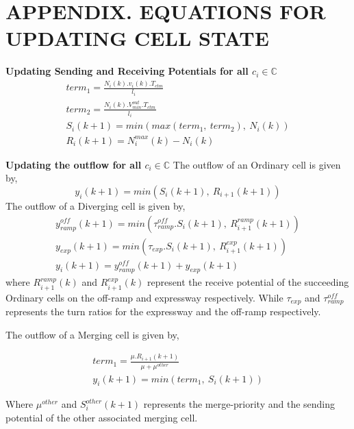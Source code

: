 \documentclass[12pt]{article}
\begin{document}
\section{APPENDIX. EQUATIONS FOR UPDATING CELL STATE}
\label{appendix:a}

\textbf{Updating Sending and Receiving Potentials for all $c_i\in \mathbb{C}$}
\begin{subequations} 
\label{eq:sp-rp}
\begin{eqnarray}
term_1=\frac{N_i(k).v_i(k).T_{ctm}}{l_i}\\
term_2=\frac{N_i(k).V^{out}_{min}.T_{ctm}}{l_i}\\
S_i(k+1)= min(max(term_1,~term_2),~N_i(k))\\
R_i(k+1)=N_i^{max}(k)-N_i(k)
\end{eqnarray}
\end{subequations}


\textbf{Updating the outflow for all $c_i\in \mathbb{C}$}
 The outflow of an Ordinary cell is given by,
 \begin{equation}
 y_i(k+1)=min(S_i(k+1),~R_{i+1}(k+1))
 \end{equation}
The outflow of a Diverging cell is given by,
 \begin{subequations} 
 \label{eq:diverging-outflow}
 \begin{eqnarray}
 y_{ramp}^{off}(k+1)=min(\tau_{ramp}^{off}.S_i(k+1),~R_{i+1}^{ramp}(k+1))\\
 y_{exp}(k+1)=min(\tau_{exp}.S_i(k+1),~R_{i+1}^{exp}(k+1))\\
 y_i(k+1)=y_{ramp}^{off}(k+1)+y_{exp}(k+1)
 \end{eqnarray}
 \end{subequations}
where $R_{i+1}^{ramp}(k)$ and $R_{i+1}^{exp}(k)$ represent the receive potential of the succeeding Ordinary cells on the off-ramp and expressway respectively. While  $\tau_{exp}$ and $\tau_{ramp}^{off}$ represents the turn ratios for the expressway and the off-ramp  respectively.

The outflow of a Merging cell is given by,

\begin{subequations} 
 \label{eq:merging-outflow}
 \begin{eqnarray}
 term_1=\frac{\mu.R_{i+1}(k+1)}{\mu+\mu^{other}}\\
 y_i(k+1)=min(term_1,~S_i(k+1))
 \end{eqnarray}
 \end{subequations}

Where $\mu^{other}$ and $S_i^{other}(k+1)$ represents the merge-priority and the sending potential of the other associated merging cell.
\end{document}

